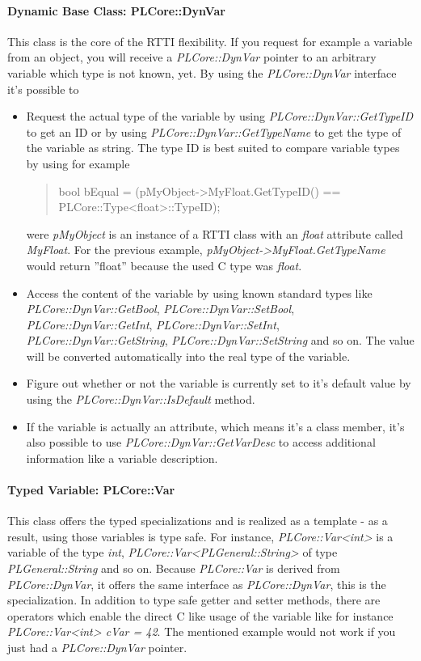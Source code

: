 \paragraph{Dynamic Base Class: PLCore::DynVar}
This class is the core of the RTTI flexibility. If you request for example a variable from an object, you will receive a \emph{PLCore::DynVar} pointer to an arbitrary variable which type is not known, yet. By using the \emph{PLCore::DynVar} interface it's possible to
\begin{itemize}
\item{Request the actual type of the variable by using \emph{PLCore::DynVar::GetTypeID} to get an ID or by using \emph{PLCore::DynVar::GetTypeName} to get the type of the variable as string. The type ID is best suited to compare variable types by using for example \begin{quote}bool bEqual = (pMyObject->MyFloat.GetTypeID() == PLCore::Type<float>::TypeID);\end{quote} were \emph{pMyObject} is an instance of a RTTI class with an \emph{float} attribute called \emph{MyFloat}. For the previous example, \emph{pMyObject->MyFloat.GetTypeName} would return ''float'' because the used C type was \emph{float}.}
\item{Access the content of the variable by using known standard types like \emph{PLCore::DynVar::GetBool}, \emph{PLCore::DynVar::SetBool}, \emph{PLCore::DynVar::GetInt}, \emph{PLCore::DynVar::SetInt}, \emph{PLCore::DynVar::GetString}, \emph{PLCore::DynVar::SetString} and so on. The value will be converted automatically into the real type of the variable.}
\item{Figure out whether or not the variable is currently set to it's default value by using the \emph{PLCore::DynVar::IsDefault} method.}
\item{If the variable is actually an attribute, which means it's a class member, it's also possible to use \emph{PLCore::DynVar::GetVarDesc} to access additional information like a variable description.}
\end{itemize}


\paragraph{Typed Variable: PLCore::Var}
This class offers the typed specializations and is realized as a template - as a result, using those variables is type safe. For instance, \emph{PLCore::Var<int>} is a variable of the type \emph{int}, \emph{PLCore::Var<PLGeneral::String>} of type \emph{PLGeneral::String} and so on. Because \emph{PLCore::Var} is derived from \emph{PLCore::DynVar}, it offers the same interface as \emph{PLCore::DynVar}, this is the specialization. In addition to type safe getter and setter methods, there are operators which enable the direct C like usage of the variable like for instance \emph{PLCore::Var<int> cVar = 42}. The mentioned example would not work if you just had a \emph{PLCore::DynVar} pointer.


